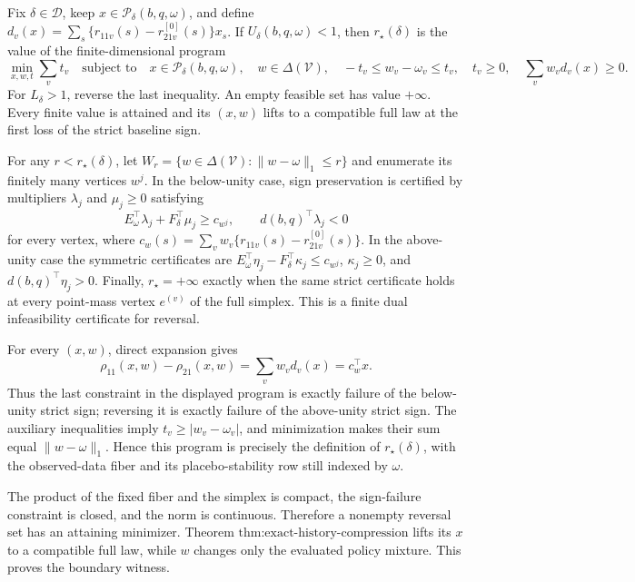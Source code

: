 Fix \(\delta\in\mathcal D\), keep \(x\in\mathcal P_\delta(b,q,\omega)\), and define \(d_v(x)=\sum_s\{r_{11v}(s)-r^{[0]}_{21v}(s)\}x_s\).  If \(U_\delta(b,q,\omega)<1\), then \(r_\star(\delta)\) is the value of the finite-dimensional program
\[
\min_{x,w,t}\sum_vt_v
\quad\text{subject to}\quad x\in\mathcal P_\delta(b,q,\omega),\quad
w\in\Delta(\mathcal V),\quad -t_v\leq w_v-\omega_v\leq t_v,\quad t_v\geq0,
\quad\sum_vw_vd_v(x)\geq0.
\]
For \(L_\delta>1\), reverse the last inequality.  An empty feasible set has value \(+\infty\).  Every finite value is attained and its \((x,w)\) lifts to a compatible full law at the first loss of the strict baseline sign.

For any \(r<r_\star(\delta)\), let \(W_r=\{w\in\Delta(\mathcal V):\lVert w-\omega\rVert_1\leq r\}\) and enumerate its finitely many vertices \(w^j\).  In the below-unity case, sign preservation is certified by multipliers \(\lambda_j\) and \(\mu_j\geq0\) satisfying
\[
E_\omega^\top\lambda_j+F_\delta^\top\mu_j\geq c_{w^j},
\qquad d(b,q)^\top\lambda_j<0
\]
for every vertex, where \(c_w(s)=\sum_vw_v\{r_{11v}(s)-r^{[0]}_{21v}(s)\}\).  In the above-unity case the symmetric certificates are \(E_\omega^\top\eta_j-F_\delta^\top\kappa_j\leq c_{w^j}\), \(\kappa_j\geq0\), and \(d(b,q)^\top\eta_j>0\).  Finally, \(r_\star=+\infty\) exactly when the same strict certificate holds at every point-mass vertex \(e^{(v)}\) of the full simplex.  This is a finite dual infeasibility certificate for reversal.

For every \((x,w)\), direct expansion gives
\[
\rho_{11}(x,w)-\rho_{21}(x,w)=\sum_vw_vd_v(x)=c_w^\top x.
\]
Thus the last constraint in the displayed program is exactly failure of the below-unity strict sign; reversing it is exactly failure of the above-unity strict sign.  The auxiliary inequalities imply \(t_v\geq|w_v-\omega_v|\), and minimization makes their sum equal \(\lVert w-\omega\rVert_1\).  Hence this program is precisely the definition of \(r_\star(\delta)\), with the observed-data fiber and its placebo-stability row still indexed by \(\omega\).

The product of the fixed fiber and the simplex is compact, the sign-failure constraint is closed, and the norm is continuous.  Therefore a nonempty reversal set has an attaining minimizer.  Theorem \(\text{thm:exact-history-compression}\) lifts its \(x\) to a compatible full law, while \(w\) changes only the evaluated policy mixture.  This proves the boundary witness.

